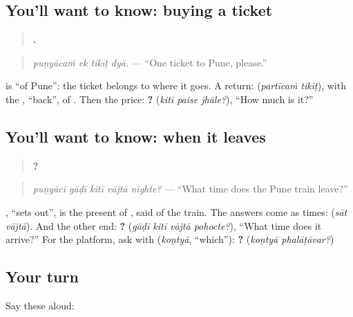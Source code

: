 \subsection*{You'll want to know: buying a ticket}
\begin{quote}
\textbf{   .}
\end{quote}

\begin{quote}
\emph{puṇyācaṁ ek tikīṭ dyā.} — \textquotedblleft{}One ticket to Pune, please.\textquotedblright{}
\end{quote}

\textbf{} is \textquotedblleft{}of Pune\textquotedblright{}: the ticket belongs to where it goes. A return: \textbf{ } (\emph{partīcaṁ tikīṭ}), with the \textbf{}, \textquotedblleft{}back\textquotedblright{}, of \textbf{}. Then the price: \textbf{  ?} (\emph{kitī paise jhāle?}), \textquotedblleft{}How much is it?\textquotedblright{}

\subsection*{You'll want to know: when it leaves}
\begin{quote}
\textbf{    ?}
\end{quote}

\begin{quote}
\emph{puṇyācī gāḍī kitī vājtā nighte?} — \textquotedblleft{}What time does the Pune train leave?\textquotedblright{}
\end{quote}

\textbf{}, \textquotedblleft{}sets out\textquotedblright{}, is the present of \textbf{}, said of the train. The answers come as times: \textbf{ } (\emph{sāt vājtā}). And the other end: \textbf{   ?} (\emph{gāḍī kitī vājtā pohocte?}), \textquotedblleft{}What time does it arrive?\textquotedblright{} For the platform, ask with \textbf{} (\emph{koṇtyā}, \textquotedblleft{}which\textquotedblright{}): \textbf{ ?} (\emph{koṇtyā phalāṭāvar?})

\subsection*{Your turn}
Say these aloud:

